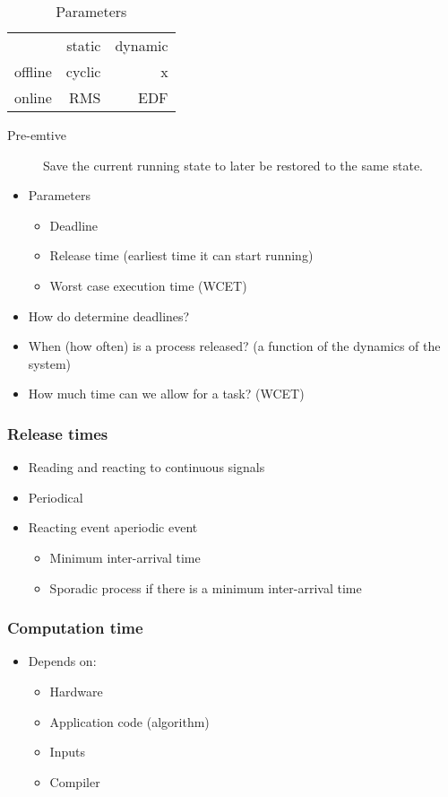 \documentclass[course, english]{Notes}
\begin{document}
\begin{table}
	\centering
	\begin{tabular}{r r r}
		& static & dynamic \\
		offline & cyclic & x \\
		online & RMS & EDF \\
	\end{tabular}
	\caption{Parameters}
\label{tab:parameters}
\end{table}

\begin{description}
	\item[Pre-emtive] Save the current running state to later be restored to
		the same state.
\end{description}

\begin{itemize}
	\item Parameters
		\begin{itemize}
			\item Deadline
			\item Release time (earliest time it can start running)
			\item Worst case execution time (WCET) 
		\end{itemize}
	\item How do determine deadlines?
	\item When (how often) is a process released? (a function of the
		dynamics of the system)
	\item How much time can we allow for a task? (WCET)

\end{itemize}
\subsubsection{Release times}
\begin{itemize}
	\item Reading and reacting to continuous signals
	\item Periodical
	\item Reacting event aperiodic event
		\begin{itemize}
			\item Minimum inter-arrival time
			\item Sporadic process if there is a minimum
				inter-arrival time
		\end{itemize}
\end{itemize}
\subsubsection{Computation time}
\begin{itemize}
	\item Depends on:
		\begin{itemize}
			\item Hardware
			\item Application code (algorithm)
			\item Inputs
			\item Compiler
		\end{itemize}
\end{itemize}
\end{document}
